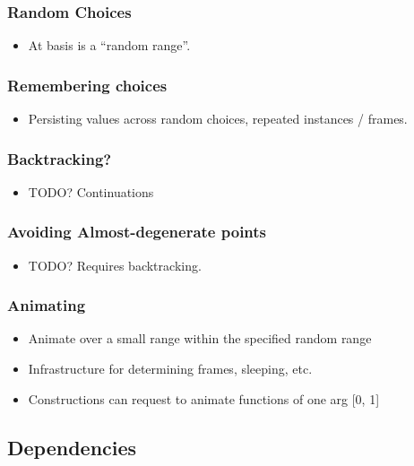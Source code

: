 \documentclass[11pt]{article}
\begin{document}
\subsubsection{Random Choices}
\label{sec-3-4-1}

\begin{itemize}
\item At basis is a ``random range''.
\end{itemize}
\subsubsection{Remembering choices}
\label{sec-3-4-2}

\begin{itemize}
\item Persisting values across random choices, repeated instances / frames.
\end{itemize}
\subsubsection{Backtracking?}
\label{sec-3-4-3}

\begin{itemize}
\item TODO? Continuations
\end{itemize}
\subsubsection{Avoiding Almost-degenerate points}
\label{sec-3-4-4}

\begin{itemize}
\item TODO? Requires backtracking.
\end{itemize}
\subsubsection{Animating}
\label{sec-3-4-5}

\begin{itemize}
\item Animate over a small range within the specified random range
\item Infrastructure for determining frames, sleeping, etc.
\item Constructions can request to animate functions of one arg [0, 1]
\end{itemize}
\subsection{Dependencies}
\label{sec-3-5}
\end{document}
